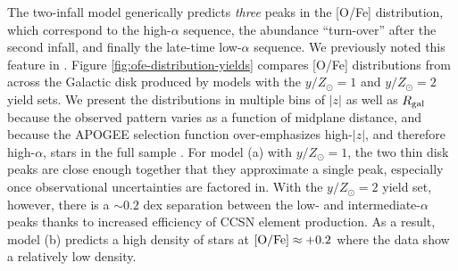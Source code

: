 \documentclass[twocolumn,twocolappendix,linenumbers]{aastex631}
\newcommand{\todo}[1]{{\color{red}#1}}
\newcommand{\mathOFe}{{\rm [O/Fe]}}
\newcommand{\yZ}[1]{$y/Z_\odot=#1$}
\begin{document}
The two-infall model generically predicts {\it three} peaks in the [O/Fe] distribution, which correspond to the high-$\alpha$ sequence, the abundance ``turn-over'' after the second infall, and finally the late-time low-$\alpha$ sequence. We previously noted this feature in \citet{dubay_galactic_2024}. Figure \ref{fig:ofe-distribution-yields} compares [O/Fe] distributions from across the Galactic disk produced by models with the \yZ{1} and \yZ{2} yield sets. We present the distributions in multiple bins of $|z|$ as well as $R_{\rm gal}$ because the observed pattern varies as a function of midplane distance, and because the APOGEE selection function over-emphasizes high-$|z|$, and therefore high-$\alpha$, stars in the full sample \citep[see Figure 5 from][]{vincenzo_distribution_2021}. For model (a) with $y/Z_\odot=1$, the two thin disk peaks are close enough together that they approximate a single peak, especially once observational uncertainties are factored in. With the \yZ{2} yield set, however, there is a $\sim0.2$ dex separation between the low- and intermediate-$\alpha$ peaks thanks to increased efficiency of CCSN element production. As a result, model (b) predicts a high density of stars at $\mathOFe\approx+0.2$ where the data show a relatively low density.

\end{document}

